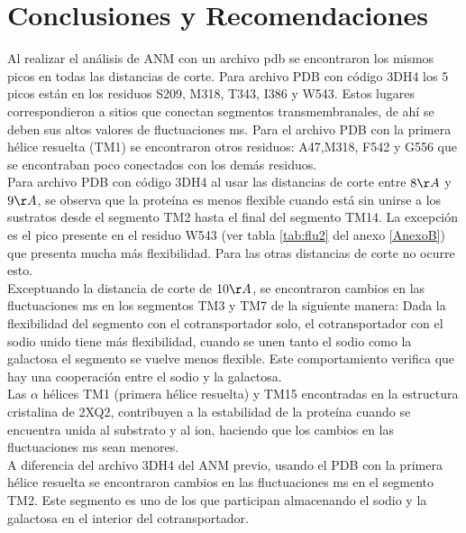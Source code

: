 \chapter{Conclusiones y Recomendaciones}\label{ch:5}
Al realizar el an\'{a}lisis de ANM con un archivo pdb se encontraron los mismos picos en todas las distancias de corte. Para archivo PDB con c\'{o}digo 3DH4 los 5 picos est\'{a}n en los residuos  S209, M318, T343, I386 y W543. Estos lugares correspondieron a sitios que conectan segmentos transmembranales, de ah\'{i} se deben sus altos valores de fluctuaciones ms. Para el archivo PDB con la primera h\'{e}lice resuelta (TM1) se encontraron otros residuos: A47,M318, F542 y G556 que se encontraban poco conectados con los dem\'{a}s residuos.\\

Para archivo PDB con c\'{o}digo 3DH4 al usar las distancias de corte entre $8\AA$ y $9\AA$, se observa que la prote\'{i}na  es menos flexible cuando est\'{a} sin unirse a los sustratos  desde el segmento TM2 hasta el final del segmento TM14. La excepci\'{o}n es el pico presente en el residuo W543 (ver tabla \ref{tab:flu2} del anexo \ref{AnexoB}) que presenta mucha m\'{a}s flexibilidad. Para las otras distancias de corte no ocurre esto.\\

Exceptuando la distancia de corte de $10\AA$, se encontraron cambios en las fluctuaciones ms en los segmentos TM3 y TM7 de la siguiente manera: Dada la flexibilidad del segmento con el cotransportador solo, el cotransportador con el sodio unido tiene m\'{a}s flexibilidad, cuando se unen tanto el sodio como la galactosa el segmento se vuelve menos flexible. Este comportamiento verifica que hay una cooperaci\'{o}n entre el sodio y la galactosa.\\

Las $\alpha$ h\'{e}lices TM1 (primera h\'{e}lice resuelta) y TM15 encontradas en la estructura cristalina de 2XQ2, contribuyen a la estabilidad de la prote\'{i}na cuando se encuentra unida al substrato y al ion, haciendo que los cambios en las fluctuaciones ms sean menores.\\

A diferencia del archivo 3DH4 del ANM previo, usando el PDB con la primera h\'{e}lice resuelta se encontraron cambios en las fluctuaciones ms en el segmento TM2. Este segmento es uno de los que participan almacenando el sodio y la galactosa en el interior del cotransportador.\\

